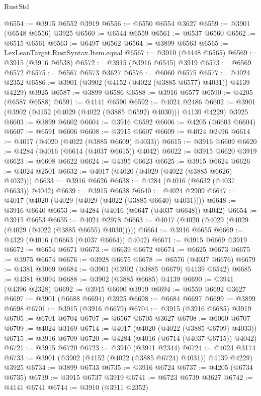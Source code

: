 \begin{lexlean}{RustStd}
\begin{coremodule}
@6554 := @3915 @6552 @3919
@6556 := @6550 @6554 @3627
@6559 := @3901 (@6548 @6556) @3925
@6560 := @6544 @6559
@6561 := @6537 @6560
@6562 := @6515 @6561
@6563 := @6497 @6562
@6564 := @3899 @6563
@6565 := LexLeanTarget.RustSyntax.Item.equal
@6567 := @3910 (@4448 @6565)
@6569 := @3915 (@3916 @6538)
@6572 := @3915 (@3916 @6545) @3919
@6573 := @6569 @6572
@6575 := @6567 @6573 @3627
@6576 := @6060 @6575
@6577 := @4024 @2352
@6586 := @3901 (@3902 (@4152 (@4022 (@3885 @6577) @4031)) @4139 @4229) @3925
@6587 := @3899 @6586
@6588 := @3916 @6577
@6590 := @4205 (@6587 @6588)
@6591 := @4141 @6590
@6592 := @4024 @2486
@6602 := @3901 (@3902 (@4152 (@4029 (@4022 (@3885 @6592) @4030))) @4139 @4229) @3925
@6603 := @3899 @6602
@6604 := @3916 @6592
@6606 := @4205 (@6603 @6604)
@6607 := @6591 @6606
@6608 := @3915 @6607
@6609 := @4024 @2496
@6614 := @4017 (@4020 (@4022 (@3885 @6609) @4033))
@6615 := @3916 @6609
@6620 := @4284 (@4016 (@6614 (@4037 @6615)) @4042)
@6622 := @3915 @6620 @3919
@6623 := @6608 @6622
@6624 := @4395 @6623
@6625 := @3915 @6624
@6626 := @4024 @2501
@6632 := @4017 (@4020 (@4029 (@4022 (@3885 @6626) @4032)))
@6633 := @3916 @6626
@6638 := @4284 (@4016 (@6632 (@4037 @6633)) @4042)
@6639 := @3915 @6638
@6640 := @4024 @2909
@6647 := @4017 (@4020 (@4029 (@4029 (@4022 (@3885 @6640) @4031))))
@6648 := @3916 @6640
@6653 := @4284 (@4016 (@6647 (@4037 @6648)) @4042)
@6654 := @3915 @6653
@6655 := @4024 @2978
@6663 := @4017 (@4020 (@4029 (@4029 (@4029 (@4022 (@3885 @6655) @4030)))))
@6664 := @3916 @6655
@6669 := @4329 (@4016 (@6663 (@4037 @6664)) @4042)
@6671 := @3915 @6669 @3919
@6672 := @6654 @6671
@6673 := @6639 @6672
@6674 := @6625 @6673
@6675 := @3975 @6674
@6676 := @3928 @6675
@6678 := @6576 (@4037 @6676)
@6679 := @4381 @3069
@6684 := @3901 (@3902 (@3885 @6679) @4139 @6542)
@6685 := @4381 @3094
@6688 := @3902 (@3885 @6685) @4139
@6690 := @3941 (@4396 @2328)
@6692 := @3915 @6690 @3919
@6694 := @6550 @6692 @3627
@6697 := @3901 (@6688 @6694) @3925
@6698 := @6684 @6697
@6699 := @3899 @6698
@6701 := @3915 (@3916 @6679)
@6704 := @3915 (@3916 @6685) @3919
@6705 := @6701 @6704
@6707 := @6567 @6705 @3627
@6708 := @6060 @6707
@6709 := @4024 @3169
@6714 := @4017 (@4020 (@4022 (@3885 @6709) @4033))
@6715 := @3916 @6709
@6720 := @4284 (@4016 (@6714 (@4037 @6715)) @4042)
@6721 := @3915 @6720
@6723 := @3910 (@3911 @2344)
@6724 := @4024 @3174
@6733 := @3901 (@3902 (@4152 (@4022 (@3885 @6724) @4031)) @4139 @4229) @3925
@6734 := @3899 @6733
@6735 := @3916 @6724
@6737 := @4205 (@6734 @6735)
@6739 := @3915 @6737 @3919
@6741 := @6723 @6739 @3627
@6742 := @4141 @6741
@6744 := @3910 (@3911 @2352)

\end{coremodule}
\end{lexlean}
